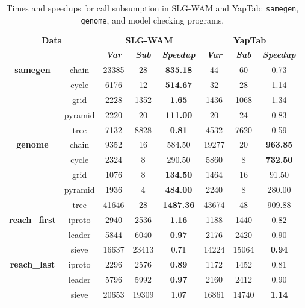 \begin{table}[ht]
\centering
\footnotesize{
  \begin{tabular}{cc|ccc|ccc}
   \hline
    \hline
    \multicolumn{2}{c|}{\multirow{2}{*}{\small{\textbf{Data}}}} & \multicolumn{3}{c|}{\small{\textbf{SLG-WAM}}} & \multicolumn{3}{c}{\small{\textbf{YapTab}}} \\
     \multicolumn{2}{c|}{} & \textbf{\textit{Var}} & \textbf{\textit{Sub}} & \textbf{\textit{Speedup}} & \textbf{\textit{Var}} & \textbf{\textit{Sub}} & \textbf{\textit{Speedup}} \\
   \hline
   \hline
   \multirow{5}{*}{\textbf{samegen}} &  \scriptsize{chain}  &  23385 & 28 &  \textbf{835.18}  & 44 & 60 &  0.73 \\
   &  \scriptsize{cycle}  &  6176 & 12 &  \textbf{514.67}  & 32 & 28 &  1.14 \\
   &  \scriptsize{grid}  &  2228 & 1352 &  \textbf{1.65}  & 1436 & 1068 &  1.34 \\
   &  \scriptsize{pyramid}  &  2220 & 20 &  \textbf{111.00}  & 20 & 24 &  0.83 \\
   &  \scriptsize{tree}  &  7132 & 8828 &  \textbf{0.81}  & 4532 & 7620 &  0.59 \\
   \hline
   \multirow{5}{*}{\textbf{genome}} &  \scriptsize{chain}  &  9352 & 16 &  584.50  & 19277 & 20 &  \textbf{963.85} \\
   &  \scriptsize{cycle}  &  2324 & 8 &  290.50  & 5860 & 8 &  \textbf{732.50} \\
   &  \scriptsize{grid}  &  1076 & 8 &  \textbf{134.50}  & 1464 & 16 &  91.50 \\
   &  \scriptsize{pyramid}  &  1936 & 4 &  \textbf{484.00}  & 2240 & 8 &  280.00 \\
   &  \scriptsize{tree}  &  41646 & 28 &  \textbf{1487.36}  & 43674 & 48 &  909.88 \\
   \hline
\multirow{3}{*}{\textbf{reach\_first}} &  \scriptsize{iproto}  &  2940 & 2536 &  \textbf{1.16}  & 1188 & 1440 &  0.82 \\
&  \scriptsize{leader}  &  5844 & 6040 &  \textbf{0.97}  & 2176 & 2420 &  0.90 \\
&  \scriptsize{sieve}  &  16637 & 23413 &  0.71  & 14224 & 15064 &  \textbf{0.94} \\
\hline
\multirow{3}{*}{\textbf{reach\_last}} &  \scriptsize{iproto}  &  2296 & 2576 &  \textbf{0.89}  & 1172 & 1452 &  0.81 \\
&  \scriptsize{leader}  &  5796 & 5992 &  \textbf{0.97}  & 2160 & 2412 &  0.90 \\
&  \scriptsize{sieve}  &  20653 & 19309 &  1.07  & 16861 & 14740 &  \textbf{1.14} \\
\hline
\hline
\end{tabular}
}
\caption{Times and speedups for call subsumption in SLG-WAM and YapTab: \texttt{samegen}, \texttt{genome}, and model checking programs.}
\label{tbl:result_detail_others}
\end{table}